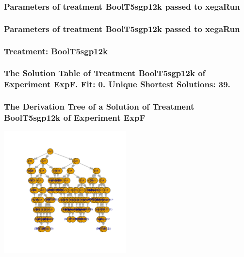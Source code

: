 \documentclass[18pt,c]{beamer}
\begin{document}

 \begin{frame}
 \fontsize{8pt}{9pt}\selectfont
 \frametitle{  Parameters of treatment BoolT5sgp12k passed to xegaRun
 }

 \label{ExpFtParmTable042.tex}  
 \end{frame}


 \begin{frame}
 \fontsize{8pt}{9pt}\selectfont
 \frametitle{  Parameters of treatment BoolT5sgp12k passed to xegaRun
 }

 \label{ExpFtParmTable043.tex}  
 \end{frame}

 \begin{frame}
 \fontsize{8pt}{9pt}\selectfont
 \frametitle{ Treatment: BoolT5sgp12k }

 \label{ExpFStatsTable016.tex}  
 \end{frame}

 \begin{frame}
 \fontsize{8pt}{9pt}\selectfont
 \frametitle{ The Solution Table of Treatment BoolT5sgp12k of Experiment ExpF. Fit: 0. Unique Shortest Solutions: 39. }

 \label{ExpFSolutionTable010.tex}  
 \end{frame}

 \begin{frame}
 \frametitle{ The Derivation Tree of a Solution of Treatment BoolT5sgp12k of Experiment ExpF }
 \begin{center}
\includegraphics[width=0.5\textwidth, angle=0]
{ExpFDerivationTreeFigure010.pdf}
 \end{center}
 \label{report/ExpFDerivationTreeFigure010.pdf}  
 \end{frame}
\end{document}
